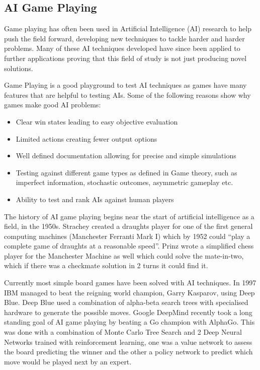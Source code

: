 \documentclass[a4paper]{article}
\begin{document}
\subsection{AI Game Playing}
Game playing has often been used in Artificial Intelligence (AI) research to help push the field forward, developing new techniques to tackle harder and harder problems.
Many of these AI techniques developed have since been applied to further applications proving that this field of study is not just producing novel solutions.
\par
Game Playing is a good playground to test AI techniques as games have many features that are helpful to testing AIs.
Some of the following reasons show why games make good AI problems:
\begin{itemize}[noitemsep,nolistsep]
    \item Clear win states leading to easy objective evaluation
    \item Limited actions creating fewer output options
    \item Well defined documentation allowing for precise and simple simulations
    \item Testing against different game types as defined in Game theory, such as imperfect information, stochastic outcomes, asymmetric gameplay etc.
    \item Ability to test and rank AIs against human players
\end{itemize}
\par
The history of AI game playing begins near the start of artificial intelligence as a field, in the 1950s.
Strachey created a draughts player for one of the first general computing machines (Manchester Ferranti Mark I) which by  1952 could ``play a complete game of draughts at a reasonable speed''\cite{BreifHistoryComputing}.
Prinz wrote a simplified chess player for the Manchester Machine as well which could solve the mate-in-two, which if there was a checkmate solution in 2 turns it could find it\cite{BreifHistoryComputing}.
\par
Currently most simple board games have been solved with AI techniques.
In 1997 IBM managed to beat the reigning world champion, Garry Kasparov, using Deep Blue.
Deep Blue used a combination of alpha-beta search trees with specialised hardware to generate the possible moves\cite{deepBlue}.
Google DeepMind recently took a long standing goal of AI game playing by beating a Go champion with AlphaGo\cite{AlphaGo}.
This was done with a combination of Monte Carlo Tree Search and 2 Deep Neural Networks trained with reinforcement learning, one was a value network to assess the board predicting the winner and the other a policy network to predict which move would be played next by an expert.
\end{document}
